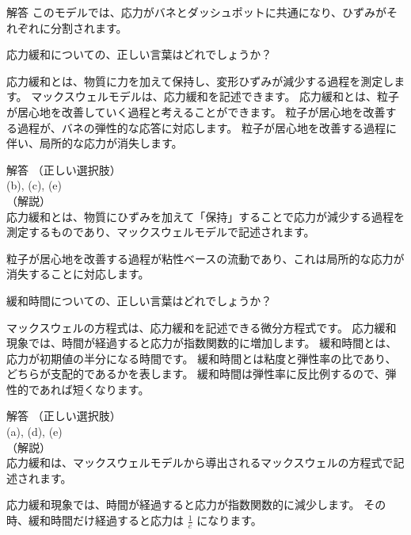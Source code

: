 \documentclass[uplatex,dvipdfmx,a4paper,11pt]{jsarticle}
\begin{document}
\begin{qlist}
\begin{itembox}[l]{解答}
			このモデルでは、応力がバネとダッシュポットに共通になり、ひずみがそれぞれに分割されます。
        \end{itembox}
	\qitem 応力緩和についての、正しい言葉はどれでしょうか？
		\begin{qlist2}
			\qitem 応力緩和とは、物質に力を加えて保持し、変形ひずみが減少する過程を測定します。
			\qitem マックスウェルモデルは、応力緩和を記述できます。
			\qitem 応力緩和とは、粒子が居心地を改善していく過程と考えることができます。
			\qitem 粒子が居心地を改善する過程が、バネの弾性的な応答に対応します。
			\qitem 粒子が居心地を改善する過程に伴い、局所的な応力が消失します。
		\end{qlist2}
		\vspace{3mm}
        \begin{itembox}[l]{解答}
            （正しい選択肢）\\
            (b), (c), (e)\\
            （解説）\\
            応力緩和とは、物質にひずみを加えて「保持」することで応力が減少する過程を測定するものであり、マックスウェルモデルで記述されます。
			
			粒子が居心地を改善する過程が粘性ベースの流動であり、これは局所的な応力が消失することに対応します。
        \end{itembox}
	\qitem 緩和時間についての、正しい言葉はどれでしょうか？
		\begin{qlist2}
			\qitem マックスウェルの方程式は、応力緩和を記述できる微分方程式です。
			\qitem 応力緩和現象では、時間が経過すると応力が指数関数的に増加します。
			\qitem 緩和時間とは、応力が初期値の半分になる時間です。
			\qitem 緩和時間とは粘度と弾性率の比であり、どちらが支配的であるかを表します。
			\qitem 緩和時間は弾性率に反比例するので、弾性的であれば短くなります。
		\end{qlist2}
		\vspace{3mm}
        \begin{itembox}[l]{解答}
            （正しい選択肢）\\
            (a), (d), (e)\\
            （解説）\\
			応力緩和は、マックスウェルモデルから導出されるマックスウェルの方程式で記述されます。

            応力緩和現象では、時間が経過すると応力が指数関数的に減少します。
			その時、緩和時間だけ経過すると応力は $\frac{1}{e}$ になります。


\end{itembox}
\end{qlist}
\end{document}
